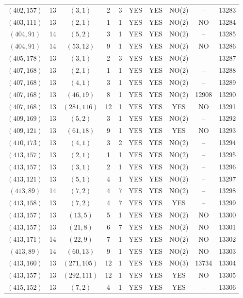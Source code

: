 \begin{longtable}{|c|c|c|c|c|c|c|c|c|c|}
$(402, 157)$ & 13 & $(3, 1)$ & 2 & 3 & YES & YES & NO(2) & -- & 13283\\
$(403, 111)$ & 13 & $(2, 1)$ & 1 & 1 & YES & YES & NO(2) & NO & 13284\\
$(404, 91)$ & 14 & $(5, 2)$ & 3 & 1 & YES & YES & NO(2) & -- & 13285\\
$(404, 91)$ & 14 & $(53, 12)$ & 9 & 1 & YES & YES & NO(2) & NO & 13286\\
$(405, 178)$ & 13 & $(3, 1)$ & 2 & 3 & YES & YES & NO(2) & -- & 13287\\
$(407, 168)$ & 13 & $(2, 1)$ & 1 & 1 & YES & YES & NO(2) & -- & 13288\\
$(407, 168)$ & 13 & $(4, 1)$ & 3 & 1 & YES & YES & NO(2) & -- & 13289\\
$(407, 168)$ & 13 & $(46, 19)$ & 8 & 1 & YES & YES & NO(2) & 12908 & 13290\\
$(407, 168)$ & 13 & $(281, 116)$ & 12 & 1 & YES & YES & YES & NO & 13291\\
$(409, 169)$ & 13 & $(5, 2)$ & 3 & 1 & YES & YES & NO(2) & -- & 13292\\
$(409, 121)$ & 13 & $(61, 18)$ & 9 & 1 & YES & YES & YES & NO & 13293\\
$(410, 173)$ & 13 & $(4, 1)$ & 3 & 2 & YES & YES & NO(2) & -- & 13294\\
$(413, 157)$ & 13 & $(2, 1)$ & 1 & 1 & YES & YES & NO(2) & -- & 13295\\
$(413, 157)$ & 13 & $(3, 1)$ & 2 & 1 & YES & YES & NO(2) & -- & 13296\\
$(413, 121)$ & 13 & $(5, 1)$ & 4 & 1 & YES & YES & NO(2) & -- & 13297\\
$(413, 89)$ & 14 & $(7, 2)$ & 4 & 7 & YES & YES & NO(2) & -- & 13298\\
$(413, 158)$ & 13 & $(7, 2)$ & 4 & 7 & YES & YES & YES & -- & 13299\\
$(413, 157)$ & 13 & $(13, 5)$ & 5 & 1 & YES & YES & NO(2) & NO & 13300\\
$(413, 157)$ & 13 & $(21, 8)$ & 6 & 7 & YES & YES & NO(2) & NO & 13301\\
$(413, 171)$ & 14 & $(22, 9)$ & 7 & 1 & YES & YES & NO(2) & NO & 13302\\
$(413, 89)$ & 14 & $(60, 13)$ & 9 & 1 & YES & YES & NO(2) & NO & 13303\\
$(413, 160)$ & 13 & $(271, 105)$ & 12 & 1 & YES & YES & NO(3) & 13734 & 13304\\
$(413, 157)$ & 13 & $(292, 111)$ & 12 & 1 & YES & YES & YES & NO & 13305\\
$(415, 152)$ & 13 & $(7, 2)$ & 4 & 1 & YES & YES & YES & -- & 13306\\

\end{longtable}
